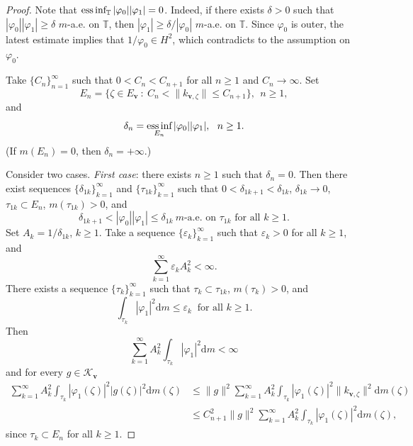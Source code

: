 \documentclass[10pt,a4paper]{amsart}
\begin{document}
\begin{proof} Note that $\mathop{\text{\rm ess\,inf}}_{\mathbb T}|\varphi_0||\varphi_1|=0$. 
Indeed, if there exists $\delta>0$ such that $|\varphi_0||\varphi_1|\geq \delta$  $m$-a.e. on $\mathbb T$, 
then $|\varphi_1|\geq \delta/|\varphi_0|$  $m$-a.e. on $\mathbb T$. Since $\varphi_0$ is outer, 
the latest estimate implies that $1/\varphi_0\in H^2$, which contradicts to the assumption on $\varphi_0$. 

Take $\{C_n\}_{n=1}^\infty$ such that $0<C_n<C_{n+1}$ for all $n\geq 1$ and $C_n\to\infty$. 
Set $$E_n=\{\zeta\in E_{\mathbf v}\ :\ C_n<\|k_{\mathbf v,\zeta}\|\leq C_{n+1}\}, \ \ n \geq 1,$$
and $$\delta_n =\mathop{\text{\rm ess\,inf}}_{E_n}|\varphi_0||\varphi_1|,\ \ n \geq 1.$$
(If $m(E_n)=0$, then $\delta_n=+\infty$.)

Consider two cases. \emph{First case}: there exists $n\geq 1$ such that $\delta_n=0$. Then 
there exist sequences $\{\delta_{1k}\}_{k=1}^\infty$ and $\{\tau_{1k}\}_{k=1}^\infty$ such that
 $0<\delta_{1k+1}<\delta_{1k}$, $\delta_{1k}\to 0$, $\tau_{1k}\subset E_n$, $m(\tau_{1k})>0$, 
and $$\delta_{1k+1}<|\varphi_0||\varphi_1|\leq\delta_{1k} \  m\text{-a.e. on }\tau_{1k} \text{ for all }k\geq 1. $$
Set $A_k=1/\delta_{1k}$, $k\geq 1$. Take a sequence $\{\varepsilon_k\}_{k=1}^\infty$ such that 
$\varepsilon_k>0$  for all $k\geq 1$, and 
\begin{equation}\label{aaepsilon} \sum_{k=1}^\infty\varepsilon_kA_k^2<\infty.\end{equation}
There  exists a sequence $\{\tau_k\}_{k=1}^\infty$ such that $\tau_k\subset\tau_{1k}$, $m(\tau_k)>0$, 
and $$\int_{\tau_k}|\varphi_1|^2{\mathrm d}m\leq\varepsilon_k \ \text{ for all }k\geq 1.$$
Then \begin{equation}\label{aavarphi1}  \sum_{k=1}^\infty A_k^2\int_{\tau_k}|\varphi_1|^2{\mathrm d}m<\infty\end{equation}
and for every $g\in\mathcal K_{\mathbf v}$ 
\begin{equation*}\begin{aligned} \sum_{k=1}^\infty   A_k^2\int_{\tau_k}|\varphi_1(\zeta)|^2|g(\zeta)|^2{\mathrm d}m(\zeta)  &
\leq \|g\|^2\sum_{k=1}^\infty A_k^2\int_{\tau_k}|\varphi_1(\zeta)|^2\|k_{\mathbf v,\zeta}\|^2{\mathrm d}m(\zeta) \\& 
\leq C_{n+1}^2\|g\|^2\sum_{k=1}^\infty A_k^2\int_{\tau_k}|\varphi_1(\zeta)|^2{\mathrm d}m(\zeta),\end{aligned}\end{equation*}
since $\tau_k\subset E_n$ for all $k\geq 1$. 


\end{proof}
\end{document}
